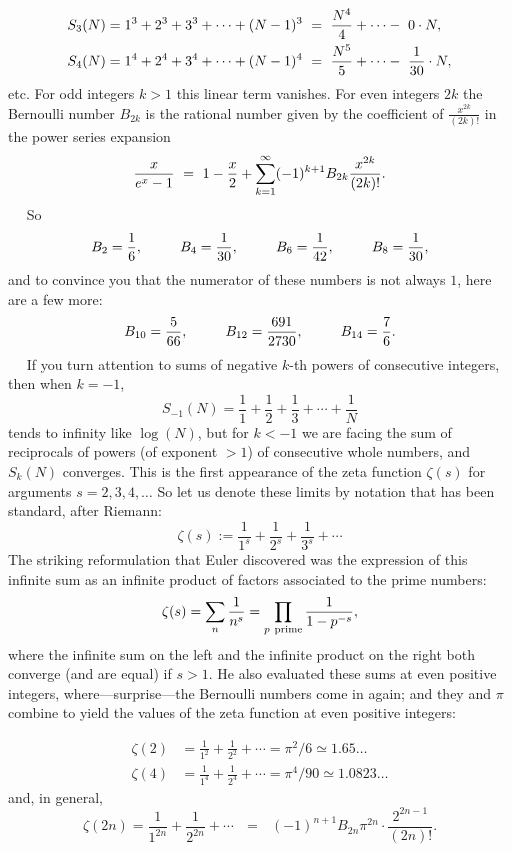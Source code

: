 \documentclass[openany]{book}
\theoremstyle{plain}
\theoremstyle{definition}
\begin{document}
{{\begin{align*}
S_3(N) &= 1^3+2^3+3^3+ \dots + (N-1)^3 \ = \  {N^4\over 4} +\cdots  -\ 0\cdot N,\\
S_4(N) &= 1^4+2^4+3^4+ \dots + (N-1)^4 \ = \  {N^5\over 5} +\cdots  -\ {1\over 30}\cdot N,
\end{align*}
etc.
For odd integers $k
> 1$ this linear term vanishes.  For even integers $2k$ the  Bernoulli number
$B_{2k}$ is the rational number given by the coefficient
of $\frac{x^{2k}}{(2k)!}$ in the power series expansion
\    \newline \bigskip \     \newline
$${x\over e^x-1} \ = \  1 - {x\over 2} +  \sum_{k=1}^{\infty}
(-1)^{k+1}B_{2k}{x^{2k}\over{(2k)}!}.$$
\    \newline \bigskip \     \newline
So
  $$ B_2 = {1\over 6},\ \ \ \ \ \ \ \   B_4 = {1\over 30},\ \ \ \ \ \ \ \   B_6 = {1\over 42},\ \ \ \ \ \ \
\   B_8 = {1\over 30},$$ and to convince you that the numerator of these numbers is not always $1$, here are
a few more:
$$B_{10} = {5\over 66},\ \ \ \ \ \ \ \   B_{12}= {691\over 2730},\ \ \ \ \ \ \ \  B_{14} = {7\over 6}.$$
\    \newline \bigskip \     \newline
If you turn attention to sums of negative $k$-th powers of consecutive
integers, then when $k= -1$, $$S_{-1}(N)= {\frac{1}{1}}+
{\frac{1}{2}}+ {\frac{1}{3}}+ \cdots+ {\frac{1}{N}}$$ tends to infinity
like $\log(N)$, but for $k < -1$ we are facing the sum of reciprocals
of powers (of exponent $>1$) of consecutive whole numbers, and
$S_k(N)$ converges. This is the first appearance of the zeta function
$\zeta(s)$ for arguments $s=2,3,4,\dots$ So let us denote these limits
by notation that has been standard, after Riemann:
$$\zeta(s):=  {\frac{1}{1^s}}+ {\frac{1}{2^s}}+ {\frac{1}{3^s}}+ \cdots$$
The striking reformulation that Euler\index{Euler, Leonhard} discovered was the expression of
this infinite sum as an infinite product of factors associated to the
prime numbers:\index{prime number}
$$
\zeta(s)=\sum_n{\frac{1}{n^s}} =
\prod_{p \ {\rm prime}}{\frac{1}{1-p^{-s}}},
$$
where the infinite sum on the left and the infinite product on the
right both converge (and are equal) if $s > 1$. He also evaluated these
sums at even positive integers, where---surprise---the Bernoulli
numbers come in again; and they and $\pi$ combine to yield the values of the zeta function at even positive integers:

\begin{align*}
\zeta(2) &= {\frac{1}{1^2}}+{\frac{1}{2^2}}+\cdots = \pi^2/6 \simeq 1.65\dots\\
\zeta(4) &= {\frac{1}{1^4}}+{\frac{1}{2^4}}+\cdots = \pi^4/90\simeq 1.0823\dots
\end{align*}
and, in general,
  $$\zeta(2n) = {\frac{1}{1^{2n}}}+{\frac{1}{2^{2n}}}+\cdots \ \ \ = \ \ \ (-1)^{n+1}B_{2n}\pi^{2n}\cdot {\frac{2^{2n-1}}{(2n)!}}.$$

}}
\end{document}
